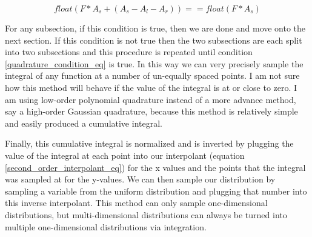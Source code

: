 \documentclass[]{article}
\begin{document}
\begin{equation}
\label{quadrature_condition_eq}
float(F*A_s + (A_s - A_l - A_r)) == float(F*A_s)
\end{equation}

For any subsection, if this condition is true, then we are done and move onto the next section. If this condition is not true then the two subsections are each split into two subsections and this procedure is repeated until condition \ref{quadrature_condition_eq} is true. In this way we can very precisely sample the integral of any function at a number of un-equally spaced points. I am not sure how this method will behave if the value of the integral is at or close to zero. I am using low-order polynomial quadrature instead of a more advance method, say a high-order Gaussian quadrature, because this method is relatively simple and easily produced a cumulative integral.

Finally, this cumulative integral is normalized and is inverted by plugging the value of the integral at each point into our interpolant (equation \ref{second_order_interpolant_eq}) for the x values and the points that the integral was sampled at for the y-values. We can then sample our distribution by sampling a variable from the uniform distribution and plugging that number into this inverse interpolant. This method can only sample one-dimensional distributions, but multi-dimensional distributions can always be turned into multiple one-dimensional distributions via integration.
\end{document}

